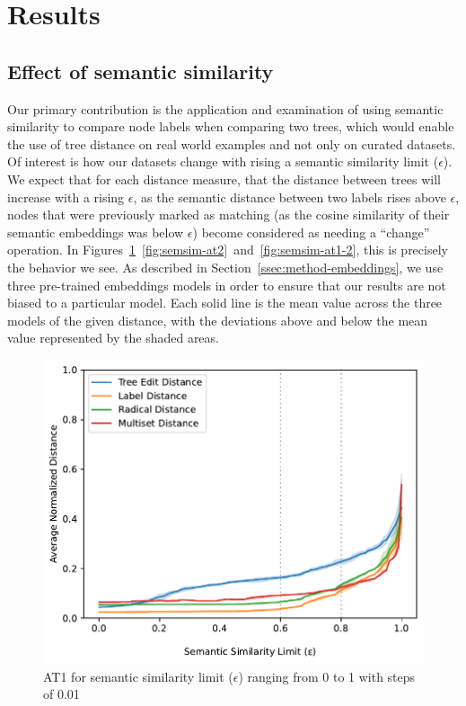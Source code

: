 \section{Results}
\label{sec:results}



\subsection{Effect of semantic similarity}

Our primary contribution is the application and examination of using semantic similarity to compare node labels when comparing two trees, which would enable the use of tree distance on real world examples and not only on curated datasets. Of interest is how our datasets change with rising a semantic similarity limit ($\epsilon$). We expect that for each distance measure, that the distance between trees will increase with a rising $\epsilon$, as the semantic distance between two labels rises above $\epsilon$, nodes that were previously marked as matching (as the cosine similarity of their semantic embeddings was below $\epsilon$) become considered as needing a ``change'' operation. In Figures~\ref{fig:semsim-at1}~\ref{fig:semsim-at2}~and~\ref{fig:semsim-at1-2}, this is precisely the behavior we see. As described in Section~\ref{ssec:method-embeddings}, we use three pre-trained embeddings models in order to ensure that our results are not biased to a particular model. Each solid line is the mean value across the three models of the given distance, with the deviations above and below the mean value represented by the shaded areas.


\begin{figure}
    \includegraphics[width=\linewidth]{code/img/similaritylimits_at1_percentage.pdf}
    \caption{AT1 for semantic similarity limit ($\epsilon$) ranging from 0 to 1 with steps of 0.01}
    \label{fig:semsim-at1}
\end{figure}

